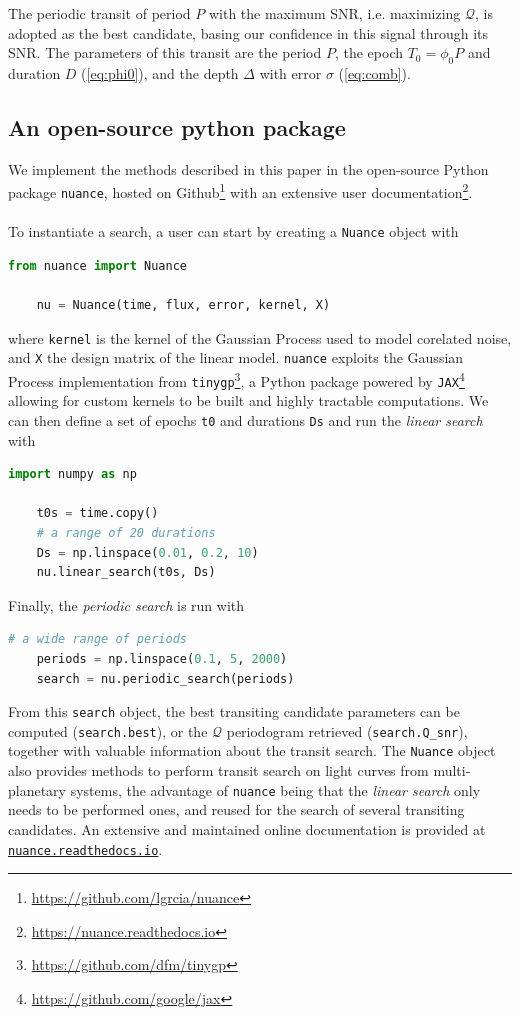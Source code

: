 \documentclass{aastex631}
\newcommand{\nuance}{\texttt{nuance}}
\begin{document}
The periodic transit of period $P$ with the maximum SNR, i.e. maximizing $\mathcal{Q}$, is adopted as the best candidate, basing our confidence in this signal through its SNR. The parameters of this transit are the period $P$, the epoch $T_0 = \phi_0 P$ and duration $D$ (\autoref{eq:phi0}), and the depth $\Delta$ with error $\sigma$ (\autoref{eq:comb}).

\newpage
\subsection{An open-source python package}
We implement the methods described in this paper in the open-source Python package \nuance{}, hosted on Github\footnote{\href{https://github.com/lgrcia/nuance}{https://github.com/lgrcia/nuance}} with an extensive user documentation\footnote{\href{https://nuance.readthedocs.io}{https://nuance.readthedocs.io}}.
\\\\
To instantiate a search, a user can start by creating a \texttt{Nuance} object with
\begin{lstlisting}[language=Python]
    from nuance import Nuance

    nu = Nuance(time, flux, error, kernel, X)
\end{lstlisting}
where \texttt{kernel} is the kernel of the Gaussian Process used to model corelated noise, and \texttt{X} the design matrix of the linear model. \nuance{} exploits the Gaussian Process implementation from \texttt{tinygp}\footnote{\href{https://github.com/dfm/tinygp}{https://github.com/dfm/tinygp}}, a Python package powered by \texttt{JAX}\footnote{\href{https://github.com/google/jax}{https://github.com/google/jax}} allowing for custom kernels to be built and highly tractable computations. We can then define a set of epochs \texttt{t0} and durations \texttt{Ds} and run the \textit{linear search} with
\begin{lstlisting}[language=Python]
    import numpy as np

    t0s = time.copy()
    # a range of 20 durations
    Ds = np.linspace(0.01, 0.2, 10)
    nu.linear_search(t0s, Ds)
\end{lstlisting}
Finally, the \textit{periodic search} is run with
\begin{lstlisting}[language=Python]
    # a wide range of periods
    periods = np.linspace(0.1, 5, 2000)
    search = nu.periodic_search(periods)
\end{lstlisting}
From this \texttt{search} object, the best transiting candidate parameters can be computed (\texttt{search.best}), or the $\mathcal{Q}$ periodogram retrieved (\texttt{search.Q\_snr}), together with valuable information about the transit search. The \texttt{Nuance} object also provides methods to perform transit search on light curves from multi-planetary systems, the advantage of \texttt{nuance} being that the \textit{linear search} only needs to be performed ones, and reused for the search of several transiting candidates. An extensive and maintained online documentation is provided at \href{https://nuance.readthedocs.io}{\texttt{nuance.readthedocs.io}}.
\end{document}
